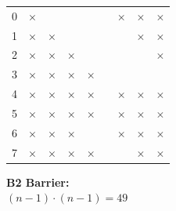 \documentclass[a4paper, 10pt]{article}
\begin{document}
\begin{itemize}
\begin{itemize}
\begin{table}[htbp]
\begin{minipage}{0.42\linewidth}
{\begin{tabular}{c | c c c c c c c c}
								\hline
								0 & $\times$ &          &          &          &        & $\times$ & $\times$ & $\times$ \\
								1 & $\times$ & $\times$ &          &          &        &          & $\times$ & $\times$ \\
								2 & $\times$ & $\times$ & $\times$ &          &        &          &          & $\times$ \\
								3 & $\times$ & $\times$ & $\times$ & $\times$ &        &          &          &          \\
								4 & $\times$ & $\times$ & $\times$ & $\times$ &        & $\times$ & $\times$ & $\times$ \\
								5 & $\times$ & $\times$ & $\times$ & $\times$ &        & $\times$ & $\times$ & $\times$ \\
								6 & $\times$ & $\times$ & $\times$ &          &        & $\times$ & $\times$ & $\times$ \\
								7 & $\times$ & $\times$ & $\times$ & $\times$ &        &          & $\times$ & $\times$ \\
							\end{tabular}
						}
					\end{minipage}
					\begin{minipage}{0.42\linewidth}
						\vspace{0.3cm}
						\textbf{B2 Barrier:} \\
						$(n-1) \cdot (n-1) = 49$ \\
						\vspace{-0.1cm} \\
\end{minipage}
\end{table}
\end{itemize}
\end{itemize}
\end{document}
